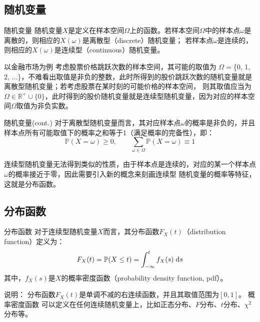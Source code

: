 \documentclass[t]{beamer}
\newcommand{\dif}{{\;\rm d}}
\renewcommand{\Pr}{\mathbb{P}}
\begin{document}
  \subsection{随机变量}
  \begin{frame}{随机变量}
    随机变量$X$是定义在样本空间$\Omega$上的函数。若样本空间$\Omega$中的样本点$\omega$是离散的，则相应的$X(\omega)$是离散型（discrete）随机变量；
    若样本点$\omega$是连续的，则相应的$X(\omega)$是连续型（continuous）随机变量。
    
    \begin{block}{以金融市场为例}
      考虑股票价格跳跃次数的样本空间，其可能的取值为
    $\Omega=$\{0, 1, 2, $\ldots$\}，不难看出取值是非负的整数，此时所得到的股价跳跃次数的随机变量就是离散型随机变量；若考虑股票在某时刻的可能价格的样本空间，
    则其取值应当为$\Omega\in
    \mathbb{R}^+\cup\{0\}$，此时得到的股价随机变量就是连续型随机变量，因为对应的样本空间$\Omega$取值为非负实数。
    \end{block}
    
  
  \end{frame}


  \begin{frame}{随机变量(cont.)}
    对于离散型随机变量而言，其对应样本点$\omega$的概率是非负的，并且样本点所有可能取值下的概率之和等于1（满足概率的完备性），即：
    \begin{equation*}\Pr(X=\omega)\ge 0, \qquad \sum_{\omega\in
    \Omega}\Pr(X=\omega)\equiv 1 \end{equation*}
    
    连续型随机变量无法得到类似的性质，由于样本点是连续的，对应的某一个样本点$\omega$的概率接近于零，因此需要引入新的概念来刻画连续型
    随机变量的概率等特征，这就是分布函数。
  
  \end{frame}
  \subsection{分布函数}
  \begin{frame}{分布函数}
    对于连续型随机变量$X$而言，其分布函数$F_X(t)$（distribution function）定义为：
    \begin{equation*}
    F_X(t)=\Pr(X\le t)=\int^{t}_{-\infty}f_X(s)\dif s 
    \end{equation*}
    其中，$f_X(s)$是$X$的概率密度函数（probability density function, pdf）。
    
    \begin{block}{说明：}
      分布函数$F_X(t)$是单调不减的右连续函数，并且其取值范围为$[0,1]$。
    概率密度函数
    可以定义在任何连续随机变量上，比如正态分布、$F$分布、$t$分布、$\chi^2$分布等。
    \end{block}
  \end{frame}
\end{document}
